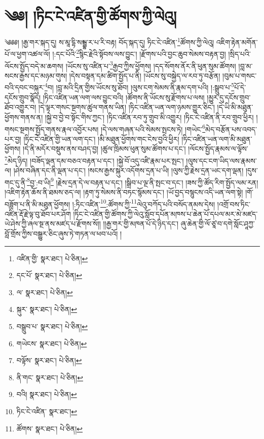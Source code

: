 \setcounter{footnote}{0} 
\chapter{༄༅། །ཏིང་ངེ་འཛིན་གྱི་ཚོགས་ཀྱི་ལེའུ།}༄༅༅། །རྒྱ་གར་སྐད་དུ། ས་མཱ་དྷི་སམྦྷ་ར་པ་རི་བརྟ། བོད་སྐད་དུ། ཏིང་ངེ་འཛིན་\footnote{འཛིན་གྱི་  སྣར་ཐང་།  པེ་ཅིན། }ཚོགས་ཀྱི་ལེའུ། འཇིག་རྟེན་མགོན་པོ་ལ་ཕྱག་འཚལ་ལོ། །:དང་པོའི་\footnote{དང་པོ་  སྣར་ཐང་།  པེ་ཅིན། }སྙིང་རྗེའི་སྟོབས་ལས་བྱུང་། །རྫོགས་པའི་བྱང་ཆུབ་སེམས་བརྟན་བྱ། །སྲིད་པའི་ལོངས་སྤྱོད་བདེ་མ་ཆགས། །ཡོངས་སུ་འཛིན་པ་\footnote{ལ་  སྣར་ཐང་།  པེ་ཅིན། }རྒྱབ་ཀྱིས་ཕྱོགས། །དད་སོགས་ནོར་ནི་ཕུན་སུམ་ཚོགས། །བླ་མ་སངས་རྒྱས་དང་མཉམ་གུས། །དེས་བསྟན་དམ་ཚིག་སྤྱོད་པ་ནི། །ཡོངས་སུ་བསྐྱེད་ལ་རབ་ཏུ་བརྩོན། །བུམ་པ་གསང་བའི་དབང་བསྐུར་\footnote{སྐུར་  སྣར་ཐང་།  པེ་ཅིན། }བ། །བླ་མའི་དྲིན་གྱིས་ཡོངས་སུ་ཐོབ། །ལུས་ངག་སེམས་ནི་རྣམ་དག་པའི། །:སྒྲུབ་པ་\footnote{བསྒྲུབ་པ་  སྣར་ཐང་།  པེ་ཅིན། }པོ་དེ་དངོས་གྲུབ་སྣོད། །ཏིང་འཛིན་ཡན་ལག་ལས་བྱུང་བའི། །ཚོགས་ནི་ཡོངས་སུ་རྫོགས་པ་ལས། །མྱུར་དུ་དངོས་གྲུབ་ཐོབ་འགྱུར་བ། །དེ་ལྟར་གསང་སྔགས་ཚུལ་གནས་ཡིན། །ཏིང་འཛིན་ཡན་ལག་ཉམས་གྱུར་ཅིང་། །དེ་ཡི་མི་མཐུན་ཕྱོགས་གནས་ན། །སྐྱེ་བ་བྱེ་བ་སྟོང་གིས་ཀྱང་། །ཏིང་འཛིན་རབ་ཏུ་གྲུབ་མི་འགྱུར། །ཏིང་ངེ་འཛིན་ནི་རབ་གྲུབ་ཕྱིར། །གསང་སྔགས་སྤྱོད་གནས་རྣལ་འབྱོར་པས། །དེ་ལས་གཞན་པའི་སེམས་སྤངས་ཏེ། །གཡེང་\footnote{གཡེངས་  སྣར་ཐང་།  པེ་ཅིན། }མེད་བརྩོན་པས་འབད་པར་བྱ། །ཏིང་ངེ་འཛིན་གྱི་ཡན་ལག་དང་། །མི་མཐུན་ཕྱོགས་གང་ངེས་བྱའི་ཕྱིར། །ཏིང་འཛིན་ཡན་ལག་མི་མཐུན་ཕྱོགས། །དེ་ནི་མདོར་བསྡུས་ནས་བཤད་བྱ། །ཚུལ་ཁྲིམས་ཕུན་སུམ་ཚོགས་པ་དང་། །ལོངས་སྤྱོད་རྣམས་ལ་ལྟོས་\footnote{བལྟོས་  སྣར་ཐང་།  པེ་ཅིན། }མེད་ཉིད། །བཟོད་ལྡན་དམ་བཅའ་བརྟན་པ་དང་། །སྐྱེ་བོ་འདུ་འཛི་རྣམ་པར་སྤང་། །ལུས་དང་ངག་ཡིད་ལས་རྣམས་ལ། །ཤེས་བཞིན་དང་ནི་ལྡན་པ་དང་། །སངས་རྒྱས་སྐུར་འདོགས་དྲན་པ་ཡི། །ལུས་ཀྱི་རྗེས་དྲན་ཡང་དག་ལྡན། །དུས་གང་དུ་ནི་\footnote{ནི་གང་  སྣར་ཐང་།  པེ་ཅིན། }བྱ་:བ་ཡི།\footnote{བའི།  སྣར་ཐང་།  པེ་ཅིན། } །རྗེས་དྲན་དེ་ལ་བརྟན་པ་དང་། །སྒྲིབ་པ་ལྔ་ནི་སྤང་བ་དང་། །ཟས་ཀྱི་ཚོད་རིག་སྤྱོད་ལམ་རན། །འཇིག་རྟེན་ཆོས་ནི་ཐམས་ཅད་ལ། །རྟག་ཏུ་སེམས་ནི་བཏང་སྙོམས་དང་། །ཡོ་བྱད་བསྙུངས་འདི་ཡན་ལག་སྟེ། །གོ་བཟློག་པ་ནི་མི་མཐུན་ཕྱོགས། །:ཏིང་འཛིན་\footnote{ཏིང་ངེ་འཛིན་  སྣར་ཐང་། }:ཚོགས་ཀྱི་\footnote{ཚོགས་  སྣར་ཐང་།  པེ་ཅིན། }ལེའུ་བཀོད་པའི་བསོད་ནམས་དེས། །འགྲོ་བས་ཏིང་འཛིན་རྡོ་རྗེ་ལྟ་བུ་ཐོབ་པར་ཤོག །ཏིང་ངེ་འཛིན་གྱི་ཚོགས་ཀྱི་ལེའུ་སློབ་དཔོན་མཁས་པ་ཆེན་པོ་དཔལ་མར་མེ་མཛད་ཡེ་ཤེས་ཀྱི་ཞལ་སྔ་ནས་མཛད་པ་རྫོགས་སོ།། །།རྒྱ་གར་གྱི་མཁན་པོ་དེ་ཉིད་དང་། ཞུ་ཆེན་གྱི་ལོ་ཙཱ་བ་དགེ་སློང་ཤཱཀྱ་བློ་གྲོས་ཀྱིས་བསྒྱུར་ཅིང་ཞུས་ཏེ་གཏན་ལ་ཕབ་པའོ། །
 